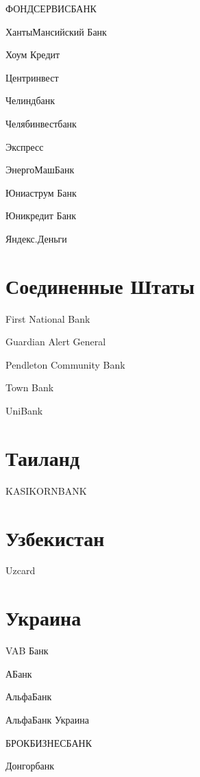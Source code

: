 \documentclass[a4paper,10pt,russian]{sphinxmanual}
\begin{document}
\sphinxAtStartPar
ФОНДСЕРВИСБАНК

\sphinxAtStartPar
Ханты\sphinxhyphen{}Мансийский Банк

\sphinxAtStartPar
Хоум Кредит

\sphinxAtStartPar
Центр\sphinxhyphen{}инвест

\sphinxAtStartPar
Челиндбанк

\sphinxAtStartPar
Челябинвестбанк

\sphinxAtStartPar
Экспресс

\sphinxAtStartPar
ЭнергоМашБанк

\sphinxAtStartPar
Юниаструм Банк

\sphinxAtStartPar
Юникредит Банк

\sphinxAtStartPar
Яндекс.Деньги


\section{Соединенные Штаты}
\label{\detokenize{banks:id12}}
\sphinxAtStartPar
First National Bank

\sphinxAtStartPar
Guardian Alert General

\sphinxAtStartPar
Pendleton Community Bank

\sphinxAtStartPar
Town Bank

\sphinxAtStartPar
UniBank


\section{Таиланд}
\label{\detokenize{banks:id13}}
\sphinxAtStartPar
KASIKORNBANK


\section{Узбекистан}
\label{\detokenize{banks:id14}}
\sphinxAtStartPar
Uzcard


\section{Украина}
\label{\detokenize{banks:id15}}
\sphinxAtStartPar
VAB Банк

\sphinxAtStartPar
АБанк

\sphinxAtStartPar
Альфа\sphinxhyphen{}Банк

\sphinxAtStartPar
Альфа\sphinxhyphen{}Банк Украина

\sphinxAtStartPar
БРОКБИЗНЕСБАНК

\sphinxAtStartPar
Донгорбанк
\end{document}

